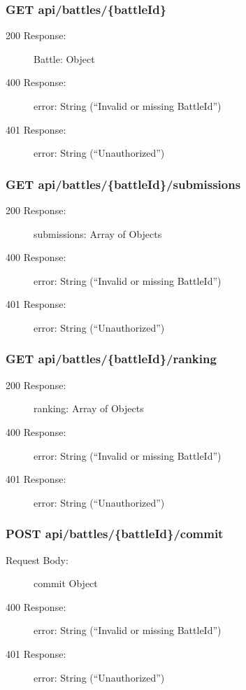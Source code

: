 \documentclass{Configuration_Files/Template}
\begin{document}
\subsubsection{GET api/battles/\{battleId\}}
\begin{description}
    \item[200 Response:] Battle: Object
    \item[400 Response:] error: String (“Invalid or missing BattleId”)
    \item[401 Response:] error: String (“Unauthorized”)
\end{description}

\subsubsection{GET api/battles/\{battleId\}/submissions}
\begin{description}
    \item[200 Response:] submissions: Array of Objects
    \item[400 Response:] error: String (“Invalid or missing BattleId”)
    \item[401 Response:] error: String (“Unauthorized”)
\end{description}

\subsubsection{GET api/battles/\{battleId\}/ranking}
\begin{description}
    \item[200 Response:] ranking: Array of Objects
    \item[400 Response:] error: String (“Invalid or missing BattleId”)
    \item[401 Response:] error: String (“Unauthorized”)
\end{description}

\subsubsection{POST api/battles/\{battleId\}/commit}
\begin{description}
    \item[Request Body:] commit Object
    \item[400 Response:] error: String (“Invalid or missing BattleId”)
    \item[401 Response:] error: String (“Unauthorized”)
\end{description}
\end{document}
